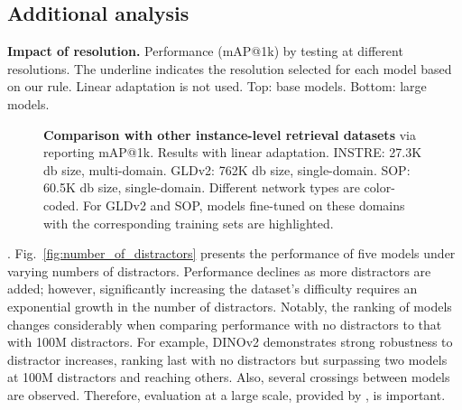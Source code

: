 \subsection{Additional analysis}
\label{sec:addan}

\begin{table}[t]
  \centering
  \scalebox{0.95}{
  \hspace{-7pt}
  }
  \vspace{-5pt}
  \caption{\textbf{Impact of resolution.} Performance (mAP@1k) by testing at different resolutions. The underline indicates the resolution selected for each model based on our rule. Linear adaptation is not used. Top: base models. Bottom: large models.
  \label{tab:resolution}
  \vspace{-10pt}
  }
\end{table}

\begin{figure*}[t]
  \centering
  \vspace{-15pt}
  \scalebox{0.9}{
    \hspace{10pt}
    
    \hspace{10pt}
     
    \hspace{10pt}
     
  }
  \vspace{-10pt}
  \caption{\textbf{Comparison with other instance-level retrieval datasets} via reporting mAP@1k. Results with linear adaptation. INSTRE: 27.3K db size, multi-domain. GLDv2: 762K db size, single-domain. SOP:  60.5K db size, single-domain. Different network types are color-coded. For GLDv2 and SOP, models fine-tuned on these domains with the corresponding training sets are highlighted.
  \label{fig:instre_gld_sop_adapt}
  \vspace{-15pt}
  }
\end{figure*}

.
Fig.~\ref{fig:number_of_distractors} presents the performance of five models under varying numbers of distractors. Performance declines as more distractors are added; however, significantly increasing the dataset's difficulty requires an exponential growth in the number of distractors. Notably, the ranking of models changes considerably when comparing performance with no distractors to that with 100M distractors. For example, DINOv2 demonstrates strong robustness to distractor increases, ranking last with no distractors but surpassing two models at 100M distractors and reaching others. Also, several crossings between models are observed. Therefore, evaluation at a large scale, provided by \ours, is important.

